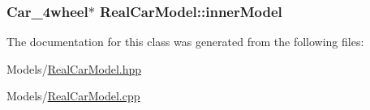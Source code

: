 \subsubsection[{\texorpdfstring{inner\+Model}{innerModel}}]{\setlength{\rightskip}{0pt plus 5cm}Car\+\_\+4wheel$\ast$ Real\+Car\+Model\+::inner\+Model\hspace{0.3cm}{\ttfamily [private]}}\hypertarget{classRealCarModel_affb73de236aa1270f45943f35bdd2f1f}{}\label{classRealCarModel_affb73de236aa1270f45943f35bdd2f1f}


The documentation for this class was generated from the following files\+:\begin{DoxyCompactItemize}
\item 
Models/\hyperlink{RealCarModel_8hpp}{Real\+Car\+Model.\+hpp}\item 
Models/\hyperlink{RealCarModel_8cpp}{Real\+Car\+Model.\+cpp}\end{DoxyCompactItemize}
